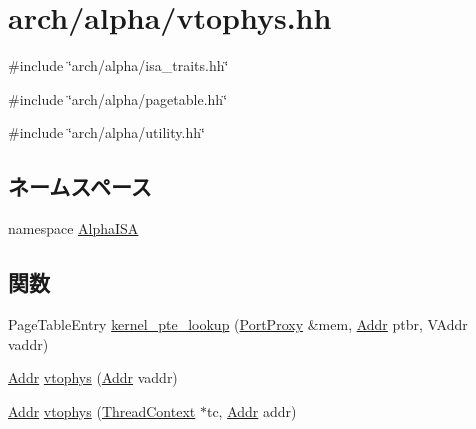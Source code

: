 \hypertarget{alpha_2vtophys_8hh}{
\section{arch/alpha/vtophys.hh}
\label{alpha_2vtophys_8hh}
}
{\ttfamily \#include \char`\"{}arch/alpha/isa\_\-traits.hh\char`\"{}}\par
{\ttfamily \#include \char`\"{}arch/alpha/pagetable.hh\char`\"{}}\par
{\ttfamily \#include \char`\"{}arch/alpha/utility.hh\char`\"{}}\par
\subsection*{ネームスペース}
\begin{DoxyCompactItemize}
\item 
namespace \hyperlink{namespaceAlphaISA}{AlphaISA}
\end{DoxyCompactItemize}
\subsection*{関数}
\begin{DoxyCompactItemize}
\item 
PageTableEntry \hyperlink{namespaceAlphaISA_a3a06f643871ad1e52bbf9892022e1ff8}{kernel\_\-pte\_\-lookup} (\hyperlink{classPortProxy}{PortProxy} \&mem, \hyperlink{base_2types_8hh_af1bb03d6a4ee096394a6749f0a169232}{Addr} ptbr, VAddr vaddr)
\item 
\hyperlink{classm5_1_1params_1_1Addr}{Addr} \hyperlink{namespaceAlphaISA_a3828815371ad2b0a1be60abdcb405cf9}{vtophys} (\hyperlink{classm5_1_1params_1_1Addr}{Addr} vaddr)
\item 
\hyperlink{classm5_1_1params_1_1Addr}{Addr} \hyperlink{namespaceAlphaISA_af1014ad6d87b8a97e9d660234574a565}{vtophys} (\hyperlink{classThreadContext}{ThreadContext} $\ast$tc, \hyperlink{classm5_1_1params_1_1Addr}{Addr} addr)
\end{DoxyCompactItemize}

